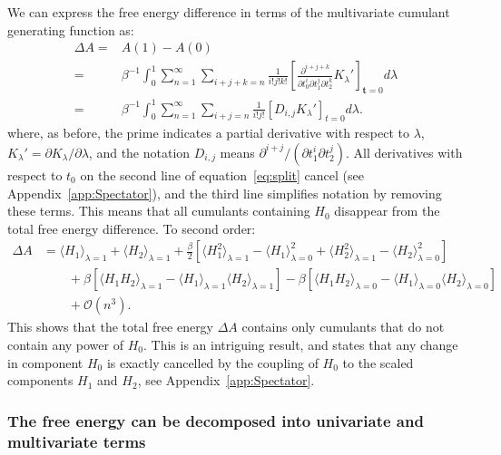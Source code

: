 \documentclass{article}
\let\vec\mathbf
\begin{document}
We can express the free energy difference in terms of the multivariate cumulant generating function as: 
\begin{align}
\Delta A =&  A(1) -  A(0) \nonumber \\
					 =&
					 \beta^{-1} \int_0^1  \sum_{n=1}^{\infty}
	        			\sum_{i+j+k=n}
            			\frac{1}{i!j!k!}\left[ \frac{\partial^{i+j+k}}{ \partial t_0^i \partial t_1^j \partial t_2^k} K_\lambda' \right]_{\vec t=0} d\lambda
				\nonumber \\	 =& 
	\beta^{-1} \int_0^1 \sum_{n=1}^{\infty}
	\sum_{i+j=n}
	\frac{1}{i!j!}
    \left[ D_{i,j} K_\lambda' \right]_{t=0} d\lambda
    \label{eq:split}.
\end{align}
where, as before, the prime indicates a partial derivative with respect to $\lambda$, $K_\lambda' =  \partial K_\lambda/ \partial \lambda$, and the notation $D_{i,j}$ means $\partial^{i+j} /(\partial t_1^i \partial t_2^j)$. All derivatives with respect to $t_0$ on the second line of equation~\ref{eq:split} cancel (see Appendix~\ref{app:Spectator}), and the third line simplifies notation by removing these terms. This means that all cumulants containing $H_0$ disappear from the total free energy difference. To second order: 
\begin{align}
\Delta A &= 
	\langle  H_1 \rangle_{\lambda=1} + \langle  H_2 \rangle_{\lambda=1} 
	+ \frac{\beta}{2} \left[ \langle  H_1^2 \rangle_{\lambda=1} -\langle  H_1 \rangle^2_{\lambda=0}  
 	+ \langle  H_2^2 \rangle_{\lambda=1} -\langle  H_2 \rangle^2_{\lambda=0}   \right] 
\nonumber \\ & \qquad 
 	+ \beta \left[ \langle  H_1 H_2\rangle_{\lambda=1} -\langle  H_1 \rangle_{\lambda=1} \langle  H_2 \rangle_{\lambda=1} \right]
   	 - \beta \left[ \langle  H_1 H_2\rangle_{\lambda=0} -\langle  H_1 \rangle_{\lambda=0} \langle  H_2 \rangle_{\lambda=0} \right]
\nonumber \\ & \qquad  
 	+ \mathcal{O} (n^3). 
\label{eq:O2_expansion_delta}
\end{align}
This shows that the total free energy $\Delta A $ contains only cumulants that do not contain any power of $H_0$. This is an intriguing result, and states that any change in component $H_0$ is exactly cancelled by the coupling of $H_0$ to the scaled components $H_1$ and $H_2$, see Appendix~\ref{app:Spectator}.  

\subsubsection{The free energy can be decomposed into univariate and multivariate terms}
\end{document}

